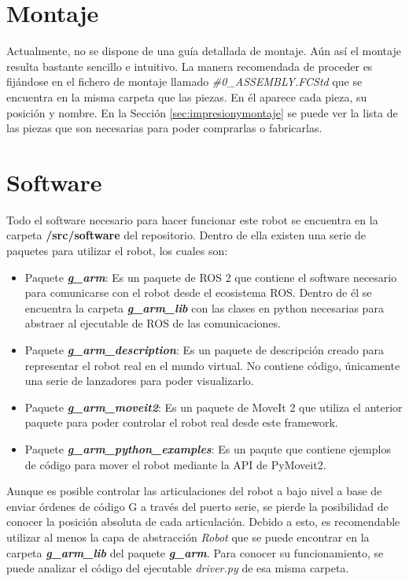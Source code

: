 \newpage
\section*{Montaje}
\noindent Actualmente, no se dispone de una guía detallada de montaje. Aún así el montaje resulta bastante sencillo 
e intuitivo. La manera recomendada de proceder es fijándose en el fichero de 
montaje llamado \textit{\#0\_ASSEMBLY.FCStd} que se encuentra en la misma carpeta que las piezas. En él 
aparece cada pieza, su posición y nombre. En la Sección \ref{sec:impresionymontaje} se puede ver la lista de las piezas que 
son necesarias para poder comprarlas o fabricarlas.

\section*{Software}
\noindent Todo el software necesario para hacer funcionar este robot se encuentra en la carpeta \textbf{/src/software} del repositorio. Dentro de 
ella existen una serie de paquetes para utilizar el robot, los cuales son:
\begin{itemize}
\item Paquete \textbf{\textit{g\_arm}}: Es un paquete de ROS 2 que contiene el software necesario para comunicarse con el robot desde el 
ecosistema ROS. Dentro de él se encuentra la carpeta \textbf{\textit{g\_arm\_lib}} con las clases en python necesarias para abstraer al 
ejecutable de ROS de las comunicaciones.
\item Paquete \textbf{\textit{g\_arm\_description}}: Es un paquete de descripción creado para representar el robot real en el mundo virtual. No contiene código, únicamente una serie de lanzadores para poder visualizarlo.
\item Paquete \textbf{\textit{g\_arm\_moveit2}}: Es un paquete de MoveIt 2 que utiliza el anterior paquete para poder controlar el robot 
real desde este framework.
\item Paquete \textbf{\textit{g\_arm\_python\_examples}}: Es un paqute que contiene ejemplos de código para mover el robot mediante la API de PyMoveit2.
\end{itemize}

Aunque es posible controlar las articulaciones del robot a bajo nivel a base de enviar órdenes de código G a través del puerto serie, se pierde la 
posibilidad de conocer la posición absoluta 
de cada articulación. Debido a esto, es recomendable utilizar al menos la capa de abstracción \textit{Robot} que se puede encontrar en 
la carpeta \textbf{\textit{g\_arm\_lib}} del paquete \textbf{\textit{g\_arm}}. Para conocer su funcionamiento, se puede analizar el código del ejecutable 
\textit{driver.py} de esa misma carpeta. 

